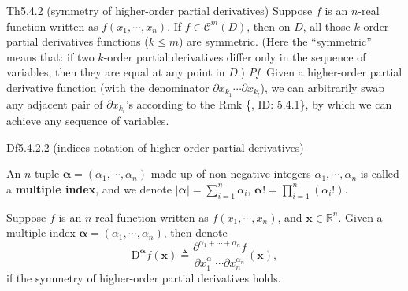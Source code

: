 \documentclass{article}
\begin{document}
\begin{Th}{Th5.4.2 (symmetry of higher-order partial derivatives)}
    Suppose $f$ is an $n$-real function written as $f(x_1, \cdots, x_n)$. If $f\in\mathcal{C}^m(D)$, then on $D$, all those $k$-order partial derivatives functions ($k\leq m$) are symmetric. (Here the ``symmetric'' means that: if two $k$-order partial derivatives differ only in the sequence of variables, then they are equal at any point in $D$.)
    \tcblower
    \textit{Pf}: Given a higher-order partial derivative function (with the denominator $\partial x_{k_1}\cdots\partial x_{k_l}$), we can arbitrarily swap any adjacent pair of $\partial x_{k_i}$'s according to the Rmk \{, ID: 5.4.1\}, by which we can achieve any sequence of variables.
\end{Th}

\begin{Df}{Df5.4.2.2 (indices-notation of higher-order partial derivatives)}
    \begin{compactenum}
        \item An $n$-tuple $\pmb{\alpha} = (\alpha_1, \cdots, \alpha_n)$ made up of non-negative integers $\alpha_1, \cdots, \alpha_n$ is called a \textbf{multiple index}, and we denote $|\pmb{\alpha}| = \sum_{i=1}^{n} \alpha_i$, $\pmb{\alpha !} = \prod_{i=1}^{n}(\alpha_i!)$.
        \item Suppose $f$ is an $n$-real function written as $f(x_1, \cdots, x_n)$, and $\pmb{x}\in\mathbb{R}^n$. Given a multiple index $\pmb{\alpha} = (\alpha_1, \cdots, \alpha_n)$, then denote 
        $$ \mathrm{D}^{\pmb{\alpha}} f(\pmb{x}) \triangleq \frac{\partial^{\alpha_1+\cdots+\alpha_n} f}{\partial x_1^{\alpha_1}\cdots\partial x_n^{\alpha_n}} (\pmb{x}), $$
        if the symmetry of higher-order partial derivatives holds.
    \end{compactenum}
\end{Df}
\end{document}
